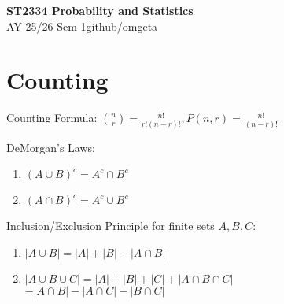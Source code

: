 \documentclass[12pt, a4paper]{article}
\newcommand{\mytitle}{ST2334 Probability and Statistics}
\newcommand{\myauthor}{github/omgeta}
\newcommand{\mydate}{AY 25/26 Sem 1}
\begin{document}
\raggedright
\footnotesize
\begin{multicols*}{3}
\setlength{\premulticols}{1pt}
\setlength{\postmulticols}{1pt}
\setlength{\multicolsep}{1pt}
\setlength{\columnsep}{2pt}

{\normalsize{\textbf{\mytitle}}} \\
{\footnotesize{\mydate\hspace{2pt}\textemdash\hspace{2pt}\myauthor}}
\section{Counting}
Counting Formula: $\displaystyle \binom nr = \frac{n!}{r!(n-r)!}, P(n, r) = \frac{n!}{(n-r)!}$

DeMorgan's Laws:
\begin{enumerate}[\roman*.]
  \item $(A\cup B)^c = A^c \cap B^c$
  \item $(A\cap B)^c = A^c \cup B^c$
\end{enumerate}

Inclusion/Exclusion Principle for finite sets $A,B,C$:
\begin{enumerate}[\roman*.]
  \item $|A \cup B|= |A| + |B| - |A\cap B|$
  \item $|A \cup B \cup C|= |A| + |B| + |C| + |A\cap B\cap C|$\\\hspace{6.7em}$- |A\cap B| - |A\cap C| - |B\cap C|$
\end{enumerate}


\end{multicols*}
\end{document}

